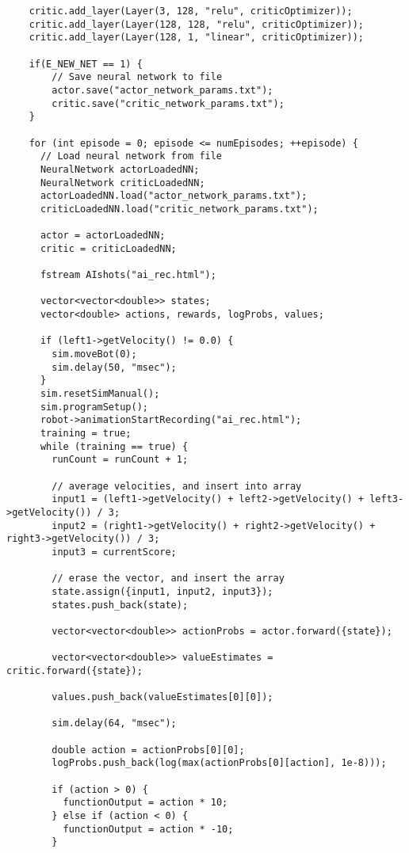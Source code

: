 \begin{verbatim}
    critic.add_layer(Layer(3, 128, "relu", criticOptimizer));
    critic.add_layer(Layer(128, 128, "relu", criticOptimizer));
    critic.add_layer(Layer(128, 1, "linear", criticOptimizer));
 
    if(E_NEW_NET == 1) {
        // Save neural network to file
        actor.save("actor_network_params.txt");
        critic.save("critic_network_params.txt");
    }
 
    for (int episode = 0; episode <= numEpisodes; ++episode) {
      // Load neural network from file
      NeuralNetwork actorLoadedNN;
      NeuralNetwork criticLoadedNN;
      actorLoadedNN.load("actor_network_params.txt");
      criticLoadedNN.load("critic_network_params.txt");
 
      actor = actorLoadedNN;
      critic = criticLoadedNN;
 
      fstream AIshots("ai_rec.html");
 
      vector<vector<double>> states;
      vector<double> actions, rewards, logProbs, values;
 
      if (left1->getVelocity() != 0.0) {
        sim.moveBot(0);
        sim.delay(50, "msec");
      }
      sim.resetSimManual();
      sim.programSetup();
      robot->animationStartRecording("ai_rec.html");
      training = true;
      while (training == true) {
        runCount = runCount + 1;
 
        // average velocities, and insert into array
        input1 = (left1->getVelocity() + left2->getVelocity() + left3->getVelocity()) / 3;
        input2 = (right1->getVelocity() + right2->getVelocity() + right3->getVelocity()) / 3;
        input3 = currentScore;
 
        // erase the vector, and insert the array
        state.assign({input1, input2, input3});
        states.push_back(state);
 
        vector<vector<double>> actionProbs = actor.forward({state});
 
        vector<vector<double>> valueEstimates = critic.forward({state});
 
        values.push_back(valueEstimates[0][0]);        
 
        sim.delay(64, "msec");
 
        double action = actionProbs[0][0];
        logProbs.push_back(log(max(actionProbs[0][action], 1e-8)));
 
        if (action > 0) {
          functionOutput = action * 10;
        } else if (action < 0) {
          functionOutput = action * -10;
        }
 

\end{verbatim}
